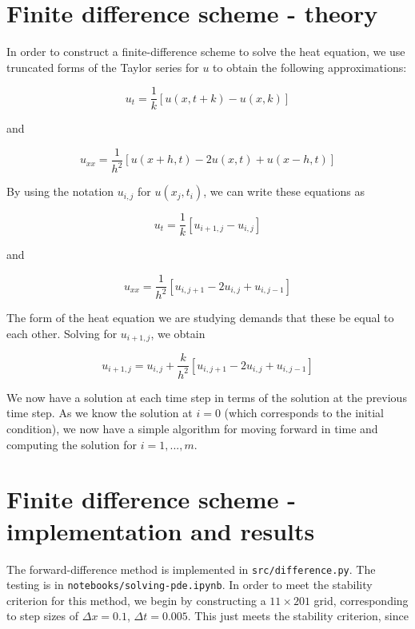 \documentclass{article}
\begin{document}
\section{Finite difference scheme - theory}
In order to construct a finite-difference scheme to solve the heat equation, we use truncated forms of the Taylor series for $u$ to obtain the following approximations:

\begin{equation}
    u_t = \frac{1}{k}[u(x, t + k) - u(x, k)]
\end{equation}

and

\begin{equation}
    u_{xx} = \frac{1}{h^2}[u(x + h, t) - 2u(x, t) + u(x - h, t)]
\end{equation}

By using the notation $u_{i, j}$ for $u(x_j, t_i)$, we can write these equations as

\begin{equation}
    u_t = \frac{1}{k}[u_{i + 1, j} - u_{i, j}]
\end{equation}

and

\begin{equation}
    u_{xx} = \frac{1}{h^2}[u_{i, j+1} - 2u_{i, j} + u_{i, j-1}]
\end{equation}

The form of the heat equation we are studying demands that these be equal to each other. Solving for $u_{i+1, j}$, we obtain

\begin{equation}
    u_{i+1, j} = u_{i, j} + \frac{k}{h^2}[u_{i, j+1} - 2u_{i, j} + u_{i, j-1}]
\end{equation}

We now have a solution at each time step in terms of the solution at the previous time step. As we know the solution at $i=0$ (which corresponds to the initial condition), we now have a simple algorithm for moving forward in time and computing the solution for $i=1, ..., m$.


\section{Finite difference scheme - implementation and results}
The forward-difference method is implemented in \texttt{src/difference.py}. The testing is in \texttt{notebooks/solving-pde.ipynb}. In order to meet the stability criterion for this method, we begin by constructing a $11 \times 201$ grid, corresponding to step sizes of $\Delta x = 0.1$, $\Delta t = 0.005$. This just meets the stability criterion, since
\end{document}
